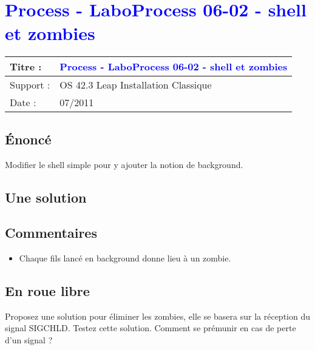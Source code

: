 \lstset{language=c}
\renewcommand{\titre}{\textcolor{blue}{ Process - LaboProcess 06-02 - shell et zombies }}

\lhead{ \titre }
\section{{\titre} }

\begin{tabular}{|l|l|}
\hline
Titre : 	& \titre \\\hline
Support : 	& OS 42.3 Leap Installation Classique \\\hline
Date :		& 07/2011 \\\hline
\end{tabular}

\subsection{Énoncé}

Modifier le shell simple pour y ajouter la notion de background. 

\subsection{Une solution}



\subsection{Commentaires}

\begin{itemize}
\item Chaque fils lancé en background donne lieu à un zombie.
\end{itemize}

\subsection{En roue libre}
Proposez une solution pour éliminer les zombies, elle se basera sur la réception du signal SIGCHLD. Testez cette solution. Comment se prémunir en cas de perte d'un signal ?
\newpage
